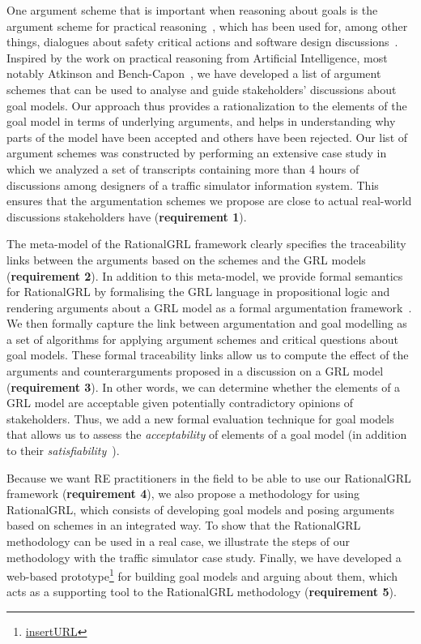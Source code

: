 One argument scheme that is important when reasoning about goals is the argument scheme for practical reasoning~\cite{walton1990,atkinson2007}, which has been used for, among other things, dialogues about safety critical actions \cite{tolchinsky2012deliberation} and software design discussions~\cite{BlackEtal2013}. Inspired by the work on practical reasoning from Artificial Intelligence, most notably Atkinson and Bench-Capon~\cite{atkinson2007}, we have developed a list of argument schemes that can be used to analyse and guide stakeholders' discussions about goal models. Our approach thus provides a rationalization to the elements of the goal model in terms of underlying arguments, and helps in understanding why parts of the model have been accepted and others have been rejected. Our list of argument schemes was constructed by performing an extensive case study in which we analyzed a set of transcripts containing more than 4 hours of discussions among designers of a traffic simulator information system. This ensures that the argumentation schemes we propose are close to actual real-world discussions stakeholders have (\textbf{requirement 1}).  

The meta-model of the RationalGRL framework clearly specifies the traceability links between the arguments based on the schemes and the GRL models (\textbf{requirement 2}). In addition to this meta-model, we provide formal semantics for RationalGRL by formalising the GRL language in propositional logic and rendering arguments about a GRL model as a formal argumentation framework~\cite{Dung1995}. We then formally capture the link between argumentation and goal modelling as a set of algorithms for applying argument schemes and critical questions about goal models. These formal traceability links allow us to compute the effect of the arguments and counterarguments proposed in a discussion on a GRL model (\textbf{requirement 3}). In other words, we can determine whether the elements of a GRL model are acceptable given potentially contradictory opinions of stakeholders. Thus, we add a new formal evaluation technique for goal models that allows us to assess the \emph{acceptability} of elements of a goal model (in addition to their \emph{satisfiability}~\cite{Amyot:2010:EGM:1841349.1841356}).

Because we want RE practitioners in the field to be able to use our RationalGRL framework (\textbf{requirement 4}), we also propose a methodology for using RationalGRL, which consists of developing goal models and posing arguments based on schemes in an integrated way. To show that the RationalGRL methodology can be used in a real case, we illustrate the steps of our methodology with the traffic simulator case study. Finally, we have developed a web-based prototype\footnote{\url{insertURL}} for building goal models and arguing about them, which acts as a supporting tool to the RationalGRL methodology (\textbf{requirement 5}). 

